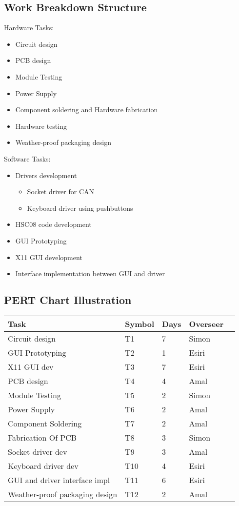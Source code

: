 \documentclass{article}
\begin{document}
\subsection {Work Breakdown Structure}

Hardware Tasks:

\begin{itemize}
\item Circuit design
\item PCB design
\item Module Testing
\item Power Supply
\item Component soldering and Hardware fabrication
\item Hardware testing 
\item Weather-proof packaging design
\end{itemize}

Software Tasks:
\begin {itemize}
\item Drivers development
\begin {itemize}
\item Socket driver for CAN
\item Keyboard driver using pushbuttons
\end {itemize}
\item HSC08 code development
\item GUI Prototyping
\item X11 GUI development
\item Interface implementation between GUI and driver
\end {itemize}

\subsection {PERT Chart Illustration}


\begin{tabular}{|l|l|l|l|l}
\hline
Task & Symbol & Days & Overseer \bigstrut \\ \hline
Circuit design	& T1	& 7	& Simon \bigstrut \\ \hline
GUI Prototyping	& T2	& 1 & Esiri \bigstrut[t] \\
X11 GUI dev	& T3 	& 7	& Esiri \bigstrut[b] \\ \hline
PCB design	& T4	& 4	& Amal \bigstrut[b] \\ \hline
Module Testing	& T5 & 2 & Simon \bigstrut[b] \\ \hline
Power Supply	& T6 & 2 & Amal \bigstrut[b] \\ \hline
Component Soldering	& T7 & 2	& Amal \bigstrut[b] \\ \hline
Fabrication Of PCB	& T8	& 3	& Simon \bigstrut[b] \\ \hline
Socket driver dev	& T9	& 3	& Amal \bigstrut[b] \\ \hline
Keyboard driver dev	& T10	& 4	& Esiri \bigstrut[b] \\ \hline
GUI and driver interface impl	& T11	& 6	& Esiri \bigstrut[b] \\ \hline
Weather-proof packaging design	& T12	& 2 & Amal \bigstrut[b] \\ \hline
\end{tabular}
\end{document}
